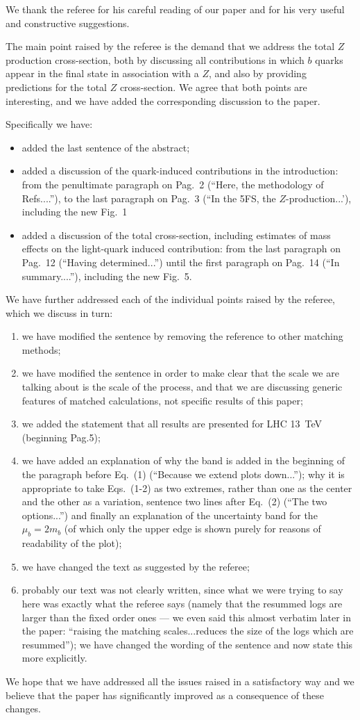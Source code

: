 \documentclass[12pt]{article}
\begin{document}
We thank the referee for his careful reading of our paper and for his
very useful and constructive suggestions.

The main point raised by the referee is the demand that we address the
total $Z$ production cross-section, both by discussing all
contributions in which $b$ quarks appear in the final state in
association with a $Z$, and also by providing predictions for the
total $Z$ cross-section. We agree that both points are interesting,
and we have added the corresponding discussion to the paper.

Specifically we have:
\begin{itemize}
\item added the last sentence of the abstract;
\item added a discussion of the quark-induced contributions in the
  introduction: from  the penultimate paragraph on Pag.~2
  (``Here, the methodology of Refs....''), 
to the last paragraph on Pag.~3
  (``In the 5FS, the $Z$-production...'), including the new Fig.~1
\item added a discussion of the total cross-section, including
  estimates of mass effects on the light-quark induced contribution:
  from the last paragraph on Pag.~12 (``Having determined...'') until
  the first paragraph on Pag.~14 (``In summary....''), including the
  new Fig.~5.
\end{itemize}

We have further addressed each of the individual points raised by the
referee, which we discuss in turn:
\begin{enumerate}
\item we have modified the sentence by removing the reference to
  other matching methods;
\item we have modified the sentence in order to make clear that the
  scale we are talking about is the scale of the process, and that we
  are discussing generic features of matched calculations, not
  specific results of this paper;
\item we added the statement that all results are presented for LHC
  13~TeV (beginning Pag.5);
\item we have added an explanation of why the band is added in the
  beginning of the paragraph before Eq.~(1) (``Because we extend
  plots down...''); why it is appropriate to take Eqs.~(1-2)
  as two extremes, rather than one as the center and the other as a
  variation, sentence two lines after Eq.~(2) (``The two
  options...'') and finally an explanation of the uncertainty band for
  the $\mu_b=2 m_b$ (of which only the upper edge is shown purely for
  reasons of readability of the plot);
\item we have changed the text as suggested by the referee;
\item probably our text was not clearly written, since what we were
  trying to say here was exactly what the referee says (namely that
  the resummed logs are larger than the fixed order ones --- we even
  said this almost verbatim later in the paper: ``raising the matching
  scales...reduces the size of the logs which are resummed''); we have
  changed the wording of the sentence and now state this more
  explicitly.
\end{enumerate}
 
We hope that we have addressed all the issues raised in a satisfactory
way and we believe that the paper has significantly improved as a
consequence of these changes.
\end{document}
